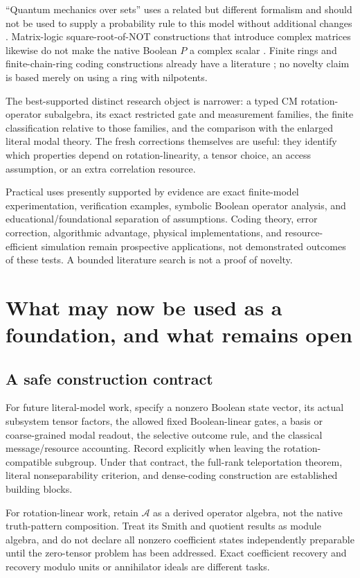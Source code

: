 \documentclass[11pt,a4paper]{article}
\theoremstyle{definition}\newtheorem{definition}[theorem]{Definition}
\newcommand{\A}{\mathcal A}
\begin{document}
``Quantum mechanics over sets'' uses a related but different formalism and should not be used to supply a probability rule to this model without additional changes \cite{ellerman2013}. Matrix-logic square-root-of-NOT constructions that introduce complex matrices likewise do not make the native Boolean $P$ a complex scalar \cite{mizraji2021}. Finite rings and finite-chain-ring coding constructions already have a literature \cite{liu2017}; no novelty claim is based merely on using a ring with nilpotents.

The best-supported distinct research object is narrower: a typed CM rotation-operator subalgebra, its exact restricted gate and measurement families, the finite classification relative to those families, and the comparison with the enlarged literal modal theory. The fresh corrections themselves are useful: they identify which properties depend on rotation-linearity, a tensor choice, an access assumption, or an extra correlation resource.

Practical uses presently supported by evidence are exact finite-model experimentation, verification examples, symbolic Boolean operator analysis, and educational/foundational separation of assumptions. Coding theory, error correction, algorithmic advantage, physical implementations, and resource-efficient simulation remain prospective applications, not demonstrated outcomes of these tests. A bounded literature search is not a proof of novelty.

\section{What may now be used as a foundation, and what remains open}
\subsection{A safe construction contract}
For future literal-model work, specify a nonzero Boolean state vector, its actual subsystem tensor factors, the allowed fixed Boolean-linear gates, a basis or coarse-grained modal readout, the selective outcome rule, and the classical message/resource accounting. Record explicitly when leaving the rotation-compatible subgroup. Under that contract, the full-rank teleportation theorem, literal nonseparability criterion, and dense-coding construction are established building blocks.

For rotation-linear work, retain $\A$ as a derived operator algebra, not the native truth-pattern composition. Treat its Smith and quotient results as module algebra, and do not declare all nonzero coefficient states independently preparable until the zero-tensor problem has been addressed. Exact coefficient recovery and recovery modulo units or annihilator ideals are different tasks.
\end{document}
